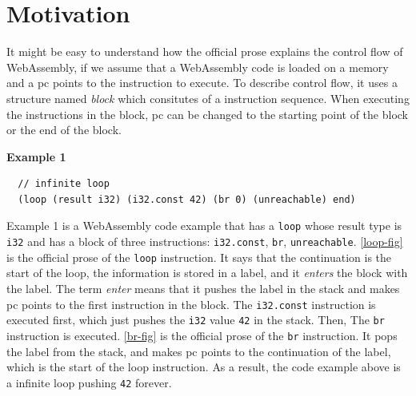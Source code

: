 
\chapter{Motivation}
\label{ch:motivation}
\noindent

\newcommand{\officialp}{official prose}
\newcommand{\spectecp}{SpecTec prose}


It might be easy to understand how the \officialp{} explains the control flow
of WebAssembly, if we assume that a WebAssembly code is loaded on a memory and
a pc points to the instruction to execute.
To describe control flow, it uses a structure named \textit{block} which
consitutes of a instruction sequence.
When executing the instructions in the block, pc can be changed to the starting
point of the block or the end of the block.

\textbf{Example 1}
\begin{verbatim}
  // infinite loop
  (loop (result i32) (i32.const 42) (br 0) (unreachable) end)
\end{verbatim}

Example 1 is a WebAssembly code example that has a \texttt{loop} whose result
type is \texttt{i32} and has a block of three instructions: \texttt{i32.const},
\texttt{br}, \texttt{unreachable}.
\cref{loop-fig} is the \officialp{} of the \texttt{loop} instruction.
It says that the continuation is the start of the loop, the information is
stored in a label, and it \textit{enters} the block with the label.
The term \textit{enter} means that it pushes the label in the stack and makes
pc points to the first instruction in the block.
The \texttt{i32.const} instruction is executed first, which just pushes the
\texttt{i32} value \texttt{42} in the stack.
Then, The \texttt{br} instruction is executed.
\cref{br-fig} is the \officialp{} of the \texttt{br} instruction.
It pops the label from the stack, and makes pc points to the continuation of
the label, which is the start of the loop instruction.
As a result, the code example above is a infinite loop pushing \texttt{42}
forever.

